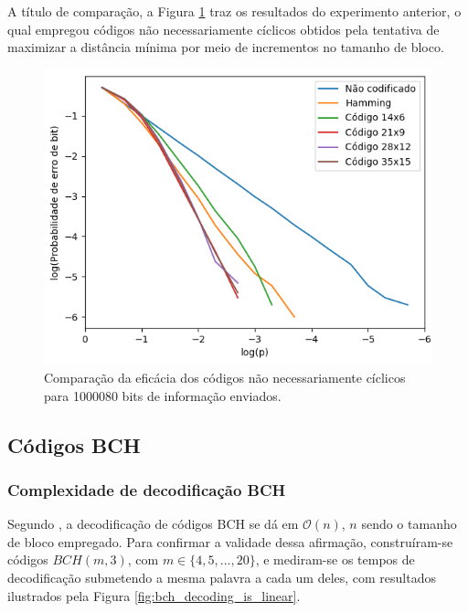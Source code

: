 A título de comparação, a Figura \ref{fig:non_cyclic_comparison} traz os resultados do experimento anterior, o qual empregou códigos não necessariamente cíclicos obtidos pela tentativa de maximizar a distância mínima por meio de incrementos no tamanho de bloco.

\begin{figure}[!hb]
	\centering
	\captionsetup{justification=centering}
	\includegraphics[scale=0.45]{floats/non_cyclic.png}
	\caption{\label{fig:non_cyclic_comparison}Comparação da eficácia dos códigos não necessariamente cíclicos para 1000080 bits de informação enviados.}
\end{figure}

\subsection{Códigos BCH}

\subsubsection{\label{complexidade_decod}Complexidade de decodificação BCH}

Segundo \cite{ref:algoritmo-berlekamp}, a decodificação de códigos BCH se dá em $\mathcal{O}(n)$, $n$ sendo o tamanho de bloco empregado. Para confirmar a validade dessa afirmação, construíram-se códigos $BCH(m, 3)$, com $m \in \lbrace 4,5,...,20 \rbrace$, e mediram-se os tempos de decodificação submetendo a mesma palavra a cada um deles, com resultados ilustrados pela Figura \ref{fig:bch_decoding_is_linear}.

